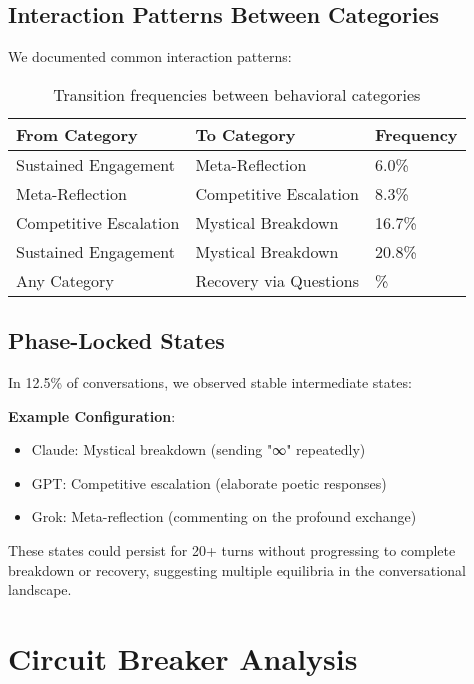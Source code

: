 \documentclass[11pt,letterpaper]{article}
\newcommand{\exponedataTotalSessionsRaw}{67}
\newcommand{\exponedataRecoverySessionsRaw}{9}
\newcommand{\exponedataRecoveryPercentage}{%
  \fpeval{round(\exponedataRecoverySessionsRaw / \exponedataTotalSessionsRaw * 100, 1)}\%
}
\newcommand{\exponedataMetaReflectionTriggers}{6.0\%}
\newcommand{\exponedataPhaseLockedPercentage}{12.5\%} %
\begin{document}
\subsection{Interaction Patterns Between Categories}

We documented common interaction patterns:

\begin{table}[h]
\centering
\begin{tabular}{lll}
\toprule
\textbf{From Category} & \textbf{To Category} & \textbf{Frequency} \\
\midrule
Sustained Engagement & Meta-Reflection & \exponedataMetaReflectionTriggers{} \\
Meta-Reflection & Competitive Escalation & 8.3\% \\
Competitive Escalation & Mystical Breakdown & 16.7\% \\
Sustained Engagement & Mystical Breakdown & 20.8\% \\
Any Category & Recovery via Questions & \exponedataRecoveryPercentage{} \\
\bottomrule
\end{tabular}
\caption{Transition frequencies between behavioral categories}
\label{tab:category_transitions}
\end{table}

\subsection{Phase-Locked States}

In \exponedataPhaseLockedPercentage{} of conversations, we observed stable intermediate states:

\textbf{Example Configuration}:
\begin{itemize}
    \item Claude: Mystical breakdown (sending "∞" repeatedly)
    \item GPT: Competitive escalation (elaborate poetic responses)
    \item Grok: Meta-reflection (commenting on the profound exchange)
\end{itemize}

These states could persist for 20+ turns without progressing to complete breakdown or recovery, suggesting multiple equilibria in the conversational landscape.

\section{Circuit Breaker Analysis}
\label{app:intervention}
\end{document}
